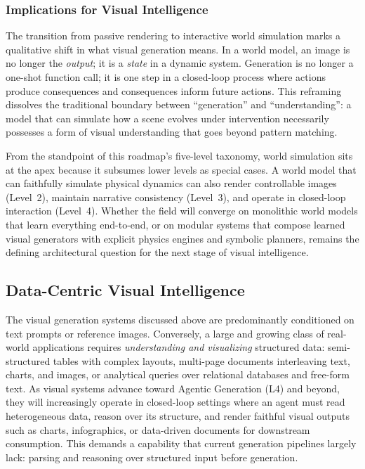\documentclass{llmxive}
\begin{document}
\subsubsection{Implications for Visual Intelligence}

The transition from passive rendering to interactive world simulation marks a qualitative shift in what visual generation means. In a world model, an image is no longer the \emph{output}; it is a \emph{state} in a dynamic system. Generation is no longer a one-shot function call; it is one step in a closed-loop process where actions produce consequences and consequences inform future actions. This reframing dissolves the traditional boundary between ``generation'' and ``understanding'': a model that can simulate how a scene evolves under intervention necessarily possesses a form of visual understanding that goes beyond pattern matching.

From the standpoint of this roadmap's five-level taxonomy, world simulation sits at the apex because it subsumes lower levels as special cases. A world model that can faithfully simulate physical dynamics can also render controllable images (Level~2), maintain narrative consistency (Level~3), and operate in closed-loop interaction (Level~4). Whether the field will converge on monolithic world models that learn everything end-to-end, or on modular systems that compose learned visual generators with explicit physics engines and symbolic planners, remains the defining architectural question for the next stage of visual intelligence.



\subsection{Data-Centric Visual Intelligence}
\label{subsec:data_centric}

The visual generation systems discussed above are predominantly conditioned on text prompts or reference images. Conversely, a large and growing class of real-world applications requires \emph{understanding and visualizing} structured data: semi-structured tables with complex layouts, multi-page documents interleaving text, charts, and images, or analytical queries over relational databases and free-form text. As visual systems advance toward Agentic Generation (L4) and beyond, they will increasingly operate in closed-loop settings where an agent must read heterogeneous data, reason over its structure, and render faithful visual outputs such as charts, infographics, or data-driven documents for downstream consumption. This demands a capability that current generation pipelines largely lack: parsing and reasoning over structured input before generation.
\end{document}
